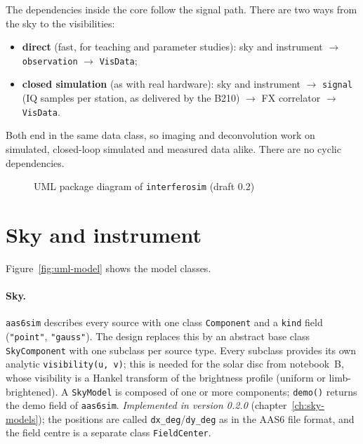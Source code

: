 The dependencies inside the core follow the signal path. There are two
ways from the sky to the visibilities:
\begin{itemize}
  \item \textbf{direct} (fast, for teaching and parameter studies):
        sky and instrument $\rightarrow$ \texttt{observation}
        $\rightarrow$ \texttt{VisData};
  \item \textbf{closed simulation} (as with real hardware): sky and
        instrument $\rightarrow$ \texttt{signal} (IQ samples per
        station, as delivered by the B210) $\rightarrow$ FX correlator
        $\rightarrow$ \texttt{VisData}.
\end{itemize}
Both end in the same data class, so imaging and deconvolution work on
simulated, closed-loop simulated and measured data alike. There are no
cyclic dependencies.

\begin{figure}[htbp]
  \centering
  
  \caption{UML package diagram of \texttt{interferosim} (draft 0.2)}
  \label{fig:uml-packages}
\end{figure}

\section{Sky and instrument}

Figure~\ref{fig:uml-model} shows the model classes.

\paragraph*{Sky.} \texttt{aas6sim} describes every source with one class
\texttt{Component} and a \texttt{kind} field (\texttt{"point"},
\texttt{"gauss"}). The design replaces this by an abstract base class
\texttt{SkyComponent} with one subclass per source type. Every subclass
provides its own analytic \texttt{visibility(u, v)}; this is needed for
the solar disc from notebook~B, whose visibility is a Hankel transform
of the brightness profile (uniform or limb-brightened). A
\texttt{SkyModel} is composed of one or more components; \texttt{demo()}
returns the demo field of \texttt{aas6sim}. \emph{Implemented in version 0.2.0}
(chapter~\ref{ch:sky-models}); the positions are called
\texttt{dx\_deg}/\texttt{dy\_deg} as in the AAS6 file format, and the
field centre is a separate class \texttt{FieldCenter}.


